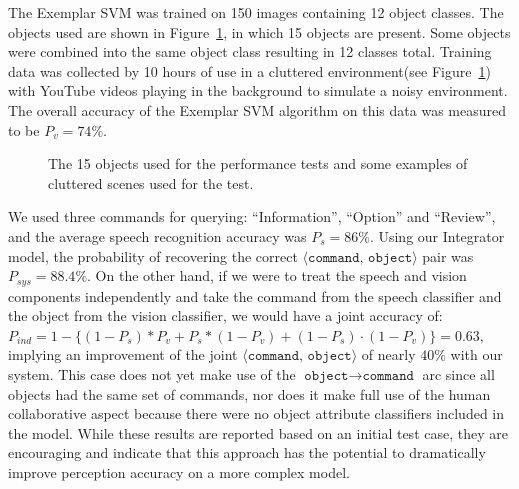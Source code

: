 \documentclass{llncs}
\begin{document}
The Exemplar SVM was trained on 150 images containing 12 object
classes. The objects used are shown in Figure~\ref{fig:test_objects},
in which 15 objects are present. Some objects were combined into the
same object class resulting in 12 classes total. Training data was
collected by 10 hours of use in a cluttered environment(see
Figure~\ref{fig:test_objects}) with YouTube videos playing in the
background to simulate a noisy environment. The overall accuracy of
the Exemplar SVM algorithm on this data was measured to be $P_v
=74\%$.
\begin{figure}
\caption{The 15 objects used for the performance tests and some
  examples of cluttered scenes used for the test.}
\label{fig:test_objects}
\end{figure}

We used three commands for querying: ``Information'', ``Option'' and
``Review'', and the average speech recognition accuracy was $P_s =
86\%$. Using our Integrator model, the probability of recovering the
correct $\langle \texttt{command, object}\rangle$ pair was
$P_{sys}=88.4\%$. On the other hand, if we were to treat the speech
and vision components independently and take the command from the
speech classifier and the object from the vision classifier, we would
have a joint accuracy of:
\begin{math}
P_{ind} = 1 - \{(1-P_s)* P_{v} + P_s * (1-P_v) + (1-P_s)\cdot (1-P_v)\} = 0.63,
\end{math}
implying an improvement of the joint $\langle \texttt{command,
  object}\rangle$ of nearly $40\%$ with our system.  This case does
not yet make use of the $\texttt{object}\rightarrow \texttt{command}$
arc since all objects had the same set of commands, nor does it make
full use of the human collaborative aspect because there were no
object attribute classifiers included in the model. While these
results are reported based on an initial test case, they are
encouraging and indicate that this approach has the potential to
dramatically improve perception accuracy on a more complex model.
\end{document}
